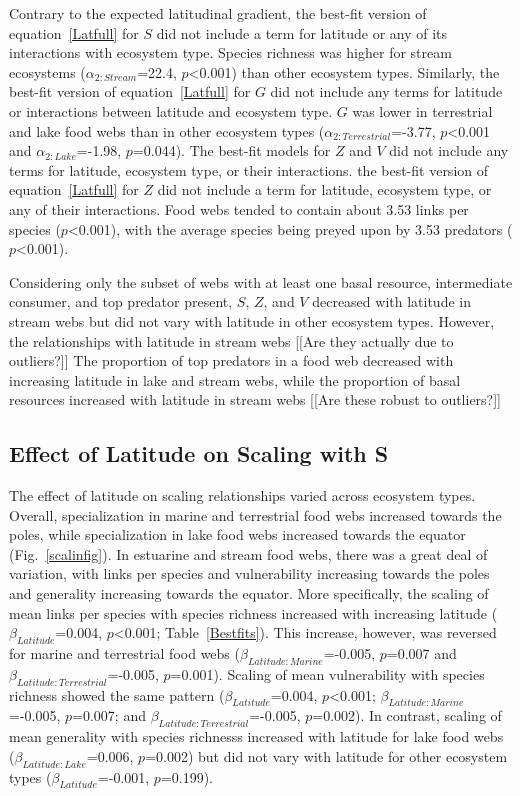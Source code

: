 \documentclass[12pt]{article}
\begin{document}
Contrary to the expected latitudinal gradient, the best-fit version of equation~\ref{Latfull} for $S$
did not include a term for latitude or any of its interactions with ecosystem type. Species richness was
higher for stream ecosystems ($\alpha_{2:Stream}$=22.4, $p$\textless0.001) than other ecosystem types. 
Similarly, the best-fit version of equation~\ref{Latfull} for $G$ did not include 
any terms for latitude or interactions between latitude and ecosystem type. $G$ was lower in terrestrial
and lake food webs than in other ecosystem types ($\alpha_{2:Terrestrial}$=-3.77, $p$\textless0.001 and 
$\alpha_{2:Lake}$=-1.98, $p$=0.044). The best-fit models for $Z$ and $V$ did not include any terms for
latitude, ecosystem type, or their interactions.
the best-fit version of equation~\ref{Latfull} for $Z$ did not include a term for latitude,
ecosystem type, or any of their interactions. Food webs tended to contain about 3.53 links per species
($p$\textless0.001), with the average species being preyed upon by 3.53 predators ($p$\textless0.001).


Considering only the subset of webs with at least one basal resource,
intermediate consumer, and top predator present, $S$, $Z$, and $V$ decreased with
latitude in stream webs but did not vary with latitude in other ecosystem types.
However, the relationships with latitude in stream webs [[Are they actually due to outliers?]]
The proportion of top predators in a food web decreased with increasing latitude in lake and
stream webs, while the proportion of basal resources increased with latitude in stream webs
[[Are these robust to outliers?]]


\subsection*{Effect of Latitude on Scaling with S}

The effect of latitude on scaling relationships varied across ecosystem types.
Overall, specialization in marine and terrestrial food webs increased towards the poles, 
while specialization in lake food webs increased towards the equator (Fig.~\ref{scalinfig}). 
In estuarine and stream food webs, there was a great deal of variation, with links per species
and vulnerability increasing towards the poles and generality increasing towards the equator.
More specifically, the scaling of mean links per species with species richness increased with
increasing latitude ($\beta_{Latitude}$=0.004, $p$\textless0.001; Table~\ref{Bestfits}). This
increase, however, was reversed for marine and terrestrial food webs
($\beta_{Latitude:Marine}$=-0.005, $p$=0.007 and
$\beta_{Latitude:Terrestrial}$=-0.005, $p$=0.001). Scaling of mean vulnerability with
species richness showed the same pattern ($\beta_{Latitude}$=0.004, $p$\textless0.001;
$\beta_{Latitude:Marine}$=-0.005, $p$=0.007; and $\beta_{Latitude:Terrestrial}$=-0.005, $p$=0.002).
In contrast, scaling of mean generality with species richnesss increased with latitude 
for lake food webs ($\beta_{Latitude:Lake}$=0.006, $p$=0.002) but did not vary with latitude for
other ecosystem types ($\beta_{Latitude}$=-0.001, $p$=0.199).
\end{document}
